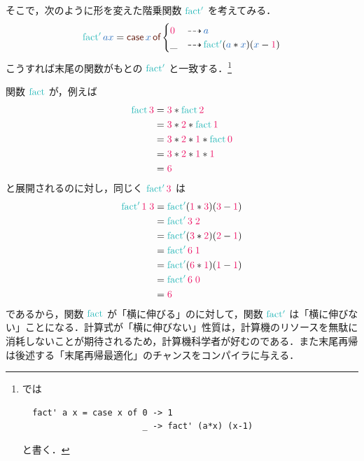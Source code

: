 \documentclass[a5paper,twoside,fleqn,draft]{jsbook}
\begin{document}
そこで，次のように形を変えた階乗関数 $\hFactPrime$ を考えてみる．
\begin{equation}
  \hFactPrime\hVar{a}\hVar{x}
  =\hCaseSyntax{\hVar{x}}
  \begin{cases}
    \hConstant{0}
    &\hIfSo\hVar{a}\\
    \_
    &\hIfSo\hFactPrime(\hVar{a}*\hVar{x})(\hVar{x}-\hConstant{1})
  \end{cases}
\end{equation}
こうすれば末尾の関数がもとの $\hFactPrime$ と一致する．\footnote{\haskell では
\begin{verbatim}
  fact' a x = case x of 0 -> 1
                        _ -> fact' (a*x) (x-1)
\end{verbatim}
と書く．}

関数 $\hFact$ が，例えば
\begin{align}
  \hFact\hConstant{3}&=\hConstant{3}*\hFact\hConstant{2}\\
  &=\hConstant{3}*\hConstant{2}*\hFact\hConstant{1}\\
  &=\hConstant{3}*\hConstant{2}*\hConstant{1}*\hFact\hConstant{0}\\
  &=\hConstant{3}*\hConstant{2}*\hConstant{1}*\hConstant{1}\\
  &=\hConstant{6}
\end{align}
と展開されるのに対し，同じく $\hFactPrime\hConstant{3}$ は
\begin{align}
  \hFactPrime\hConstant{1}\;\hConstant{3}
  &=\hFactPrime(\hConstant{1}*\hConstant{3})(\hConstant{3}-\hConstant{1})\\
  &=\hFactPrime\hConstant{3}\;\hConstant{2}\\
  &=\hFactPrime(\hConstant{3}*\hConstant{2})(\hConstant{2}-\hConstant{1})\\
  &=\hFactPrime\hConstant{6}\;\hConstant{1}\\
  &=\hFactPrime(\hConstant{6}*\hConstant{1})(\hConstant{1}-\hConstant{1})\\
  &=\hFactPrime\hConstant{6}\;\hConstant{0}\\
  &=\hConstant{6}
\end{align}
であるから，関数 $\hFact$ が「横に伸びる」のに対して，関数 $\hFactPrime$ は「横に伸びない」ことになる．計算式が「横に伸びない」性質は，計算機のリソースを無駄に消耗しないことが期待されるため，計算機科学者が好むのである．また末尾再帰は後述する「末尾再帰最適化」のチャンスをコンパイラに与える．

\end{document}
